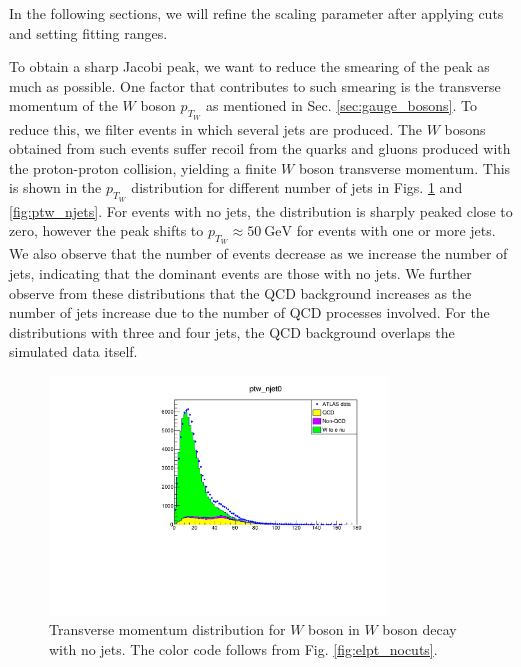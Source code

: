 \documentclass[a4paper]{report}
\numberwithin{equation}{section}
\begin{document}
In the following sections, we will refine the scaling parameter after applying cuts and setting fitting ranges. \par 

To obtain a sharp Jacobi peak, we want to reduce the smearing of the peak as much as possible. One factor that contributes 
to such smearing is the transverse momentum of the $W$ boson $p_{T_W}$ as mentioned in Sec. \ref*{sec:gauge_bosons}. To reduce this, 
we filter events in which several jets are produced. The $W$ bosons obtained from such events suffer recoil from the quarks and gluons 
produced with the proton-proton collision, yielding a finite $W$ boson transverse momentum. This is shown in the $p_{T_W}$ distribution 
for different number of jets in Figs. \ref{fig:ptw_njet0} and \ref{fig:ptw_njets}. For events with no jets, the distribution is 
sharply peaked close to zero, however the peak shifts to $p_{T_W} \approx \SI{50}{\giga\electronvolt}$ for events with one or more jets. 
We also observe that the number of events decrease as we increase the number of jets, indicating that the dominant events are those with 
no jets. We further observe from these distributions that the QCD background increases as the number of jets increase due to the number of QCD processes involved. For the distributions with 
three and four jets, the QCD background overlaps the simulated data itself.  

\begin{figure}[htpb]
    \centering
    \includegraphics[width=0.8\textwidth]{ptw_qcd30_njet0.pdf}
    \caption{Transverse momentum distribution for $W$ boson in $W$ boson decay with no jets. The color code follows from Fig. \ref{fig:elpt_nocuts}.}
    \label{fig:ptw_njet0}
\end{figure}
\end{document}
